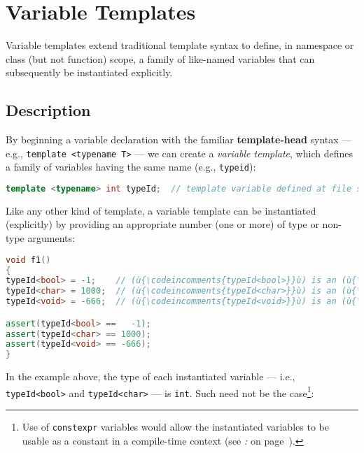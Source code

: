 \newpage
\section[Variable Templates]{Variable Templates}
\label{variable-templates}


Variable templates extend traditional template syntax to define, in namespace or
class (but not function) scope, a family of like-named variables that
can subsequently be instantiated explicitly.

\subsection[Description]{Description}\label{variabletemplate-description}

By beginning a variable declaration with the familiar
\textbf{template-head} syntax --- e.g.,
\texttt{template}~\texttt{<typename}~\texttt{T>} --- we can create a
\emph{variable template}, which defines a family of variables having the
same name (e.g., \texttt{typeid}):

\begin{lstlisting}[language=C++]
template <typename> int typeId;  // template variable defined at file scope
\end{lstlisting}

\noindent Like any other kind of template, a variable template can be instantiated
(explicitly) by providing an appropriate number (one or more) of type or
non-type arguments:

\begin{lstlisting}[language=C++]
void f1()
{
typeId<bool> = -1;    // (ù{\codeincomments{typeId<bool>}}ù) is an (ù{\codeincomments{int}}ù)
typeId<char> = 1000;  // (ù{\codeincomments{typeId<char>}}ù) is an (ù{\codeincomments{int}}ù)
typeId<void> = -666;  // (ù{\codeincomments{typeId<void>}}ù) is an (ù{\codeincomments{int}}ù)

assert(typeId<bool> ==   -1);
assert(typeId<char> == 1000);
assert(typeId<void> == -666);
}
\end{lstlisting}

\noindent In the example above, the type of each instantiated variable --- i.e.,
\texttt{typeId<bool>} and \texttt{typeId<char>} --- is \texttt{int}.
Such need not be the case{\cprotect\footnote{Use of
\texttt{constexpr} variables would allow the instantiated
variables to be usable as a constant in a compile-time context (see
{\it{}:} {\it{}} on page~\pageref{parametrized-constants}).}}:

